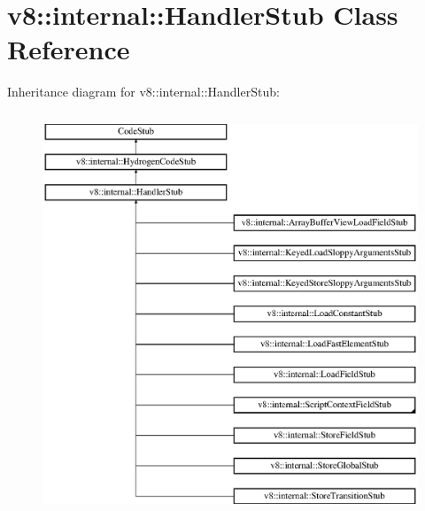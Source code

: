 \hypertarget{classv8_1_1internal_1_1_handler_stub}{}\section{v8\+:\+:internal\+:\+:Handler\+Stub Class Reference}
\label{classv8_1_1internal_1_1_handler_stub}
Inheritance diagram for v8\+:\+:internal\+:\+:Handler\+Stub\+:\begin{figure}[H]
\begin{center}
\leavevmode
\includegraphics[height=12.000000cm]{classv8_1_1internal_1_1_handler_stub}
\end{center}
\end{figure}
